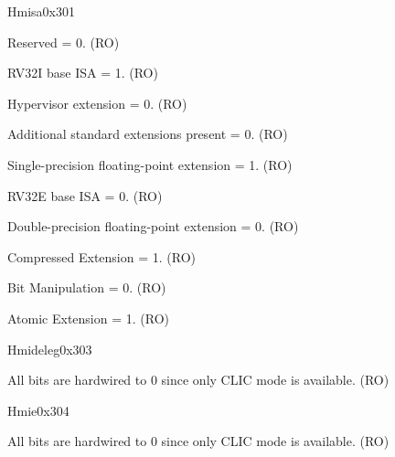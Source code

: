 \begin{register}{H}{misa}{0x301}
\begin{regdesc}
\begin{reglist}
\label{fielddesc:MISAJ}\item [J] Reserved = 0.  (RO)
\label{fielddesc:MISAI}\item [I] RV32I base ISA = 1. (RO)
\label{fielddesc:MISAH}\item [H] Hypervisor extension = 0. (RO)
\label{fielddesc:MISAG}\item [G] Additional standard extensions present = 0. (RO)
\label{fielddesc:MISAF}\item [F] Single-precision floating-point extension = 1. (RO)
\label{fielddesc:MISAE}\item [E] RV32E base ISA = 0. (RO)
\label{fielddesc:MISAD}\item [D] Double-precision floating-point extension = 0. (RO)
\label{fielddesc:MISAC}\item [C] Compressed Extension = 1. (RO)
\label{fielddesc:MISAB}\item [B] Bit Manipulation = 0. (RO)
\label{fielddesc:MISAA}\item [A] Atomic Extension = 1. (RO)
\end{reglist}\end{regdesc}
\end{register}

\begin{register}{H}{mideleg}{0x303}\label{regdesc:MIDELEG_REG}
%
\regnewline%
\begin{regdesc}\begin{reglist}
\label{fielddesc:MIDELEG}\item [{mideleg}] All bits are hardwired to 0 since only CLIC mode is available. (RO)
\end{reglist}\end{regdesc}
\end{register}

\begin{register}{H}{mie}{0x304}\label{regdesc:MIE_REG}
%
\regnewline%
\begin{regdesc}\begin{reglist}
\label{fielddesc:MIE}\item [{mie}] All bits are hardwired to 0 since only CLIC mode is available. (RO)
\end{reglist}\end{regdesc}
\end{register}

